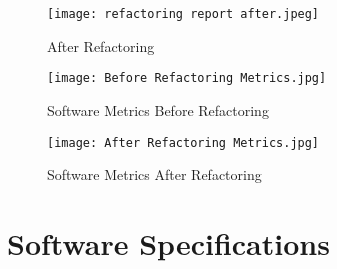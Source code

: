 \documentclass[12pt,english]{article}
\begin{document}
\begin{figure}[h!]
    \centering
    \texttt{[image: refactoring report after.jpeg]}
    \caption{After Refactoring}
\end{figure}
\newpage
\begin{figure}[h!]
    \centering
    \texttt{[image: Before Refactoring Metrics.jpg]}
    \caption{Software Metrics Before Refactoring}
\end{figure}
\begin{figure}[h!]
    \centering
    \texttt{[image: After Refactoring Metrics.jpg]}
    \caption{Software Metrics After Refactoring}
\end{figure}

\newpage
\section{ Software Specifications}
\end{document}
